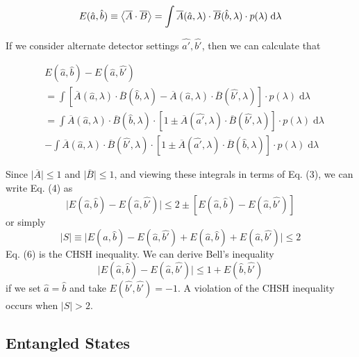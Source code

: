 \documentclass[aps,prl,nofootinbib,twocolumn,superscriptaddress,groupedaddress]{revtex4}  %
\begin{document}
\begin{equation}
E(\hat{a}, \hat{b}) \equiv \expval{\overline{A}\cdot\overline{B}} =  \int\overline{A}(\hat{a},\lambda)\cdot\overline{B}(\hat{b},\lambda)\cdot p(\lambda)\;\mathrm{d}\lambda
\end{equation}

If we consider alternate detector settings $\hat{a'}, \hat{b'}$, then we can calculate that

\begin{align}
& E(\hat{a}, \hat{b}) - E(\hat{a}, \hat{b'}) \nonumber \\
&= \int [\overline{A}(\hat{a},\lambda)\cdot\overline{B}(\hat{b},\lambda) - \overline{A}(\hat{a},\lambda)\cdot\overline{B}(\hat{b'},\lambda)] \cdot p(\lambda)\;\mathrm{d}\lambda\nonumber \\
&= \int \overline{A}(\hat{a},\lambda)\cdot\overline{B}(\hat{b},\lambda)\cdot [1 \pm  \overline{A}(\hat{a'},\lambda)\cdot\overline{B}(\hat{b'},\lambda)]\cdot p(\lambda)\;\mathrm{d}\lambda\nonumber \\
&- \int \overline{A}(\hat{a},\lambda)\cdot\overline{B}(\hat{b'},\lambda)\cdot [1 \pm  \overline{A}(\hat{a'},\lambda)\cdot\overline{B}(\hat{b},\lambda)]\cdot p(\lambda)\;\mathrm{d}\lambda
\end{align}

Since $\lvert \overline{A} \rvert \leq 1$ and $\lvert \overline{B} \rvert \leq 1$, and viewing these integrals in terms of Eq. (3), we can write Eq. (4) as
\begin{equation}
\lvert E(\hat{a}, \hat{b}) - E(\hat{a}, \hat{b'}) \rvert \leq 2 \pm   [E(\hat{a}, \hat{b}) - E(\hat{a}, \hat{b'})]
\end{equation}
or simply 
\begin{equation}
\lvert S \rvert \equiv \lvert E(\hat{a}, \hat{b}) - E(\hat{a}, \hat{b'}) + E(\hat{a}, \hat{b}) + E(\hat{a}, \hat{b'})\rvert \leq 2
\end{equation}
Eq. (6) is the CHSH inequality. We can derive Bell's inequality 
\begin{equation}
\lvert E(\hat{a}, \hat{b}) - E(\hat{a}, \hat{b'}) \rvert \leq 1 + E(\hat{b}, \hat{b'})
\end{equation}
if we set $\hat{a} = \hat{b}$ and take $E(\hat{b'}, \hat{b'}) = -1$. A violation of the CHSH inequality occurs when $\lvert S \rvert > 2$.
\subsection{Entangled States}
\end{document}
